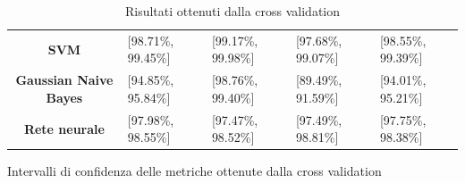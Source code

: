 \begin{table}[!ht]
\begin{subtable}[h]{1\textwidth}
\begin{tabular}{@{}cllll@{}}
            \cellcolor[HTML]{EFEFEF}\textbf{SVM}                  & [98.71\%, 99.45\%] & [99.17\%, 99.98\%] & [97.68\%, 99.07\%] & [98.55\%, 99.39\%] \\
            \cellcolor[HTML]{EFEFEF}\textbf{Gaussian Naive Bayes} & [94.85\%, 95.84\%] & [98.76\%, 99.40\%] & [89.49\%, 91.59\%] & [94.01\%, 95.21\%] \\
            \cellcolor[HTML]{EFEFEF}\textbf{Rete neurale}         & [97.98\%, 98.55\%] & [97.47\%, 98.52\%] & [97.49\%, 98.81\%] & [97.75\%, 98.38\%] \\ \bottomrule
        \end{tabular}
        \caption{Intervalli di confidenza delle metriche ottenute dalla cross validation}
        \label{tab:intervalli_confidenza_corr}
    \end{subtable}
    \caption{Risultati ottenuti dalla cross validation}
    \label{tab:metriche_intervalli_confidenza_corr}
\end{table}
